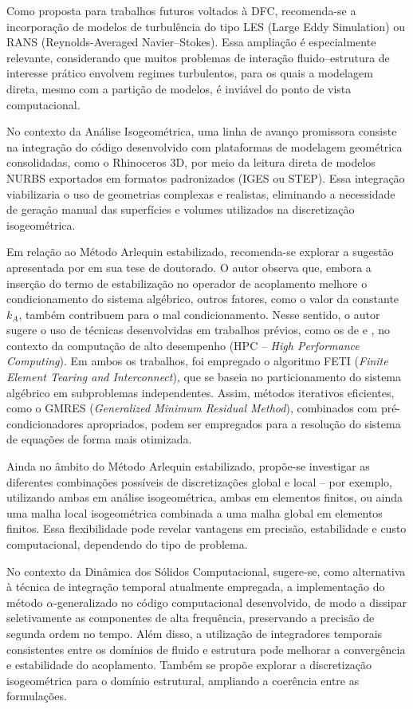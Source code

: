 Como proposta para trabalhos futuros voltados à DFC, recomenda-se a incorporação de modelos de turbulência do tipo LES (Large Eddy Simulation) ou RANS (Reynolds-Averaged Navier–Stokes). Essa ampliação é especialmente relevante, considerando que muitos problemas de interação fluido–estrutura de interesse prático envolvem regimes turbulentos, para os quais a modelagem direta, mesmo com a partição de modelos, é inviável do ponto de vista computacional.

No contexto da Análise Isogeométrica, uma linha de avanço promissora consiste na integração do código desenvolvido com plataformas de modelagem geométrica consolidadas, como o Rhinoceros 3D, por meio da leitura direta de modelos NURBS exportados em formatos padronizados (IGES ou STEP). Essa integração viabilizaria o uso de geometrias complexas e realistas, eliminando a necessidade de geração manual das superfícies e volumes utilizados na discretização isogeométrica.

Em relação ao Método Arlequin estabilizado, recomenda-se explorar a sugestão apresentada por  em sua tese de doutorado. O autor observa que, embora a inserção do termo de estabilização no operador de acoplamento melhore o condicionamento do sistema algébrico, outros fatores, como o valor da constante $k_A$, também contribuem para o mal condicionamento.  
Nesse sentido, o autor sugere o uso de técnicas desenvolvidas em trabalhos prévios, como os de  e , no contexto da computação de alto desempenho (HPC -- \textit{High Performance Computing}).  
Em ambos os trabalhos, foi empregado o algoritmo FETI (\textit{Finite Element Tearing and Interconnect}), que se baseia no particionamento do sistema algébrico em subproblemas independentes.  
Assim, métodos iterativos eficientes, como o GMRES (\textit{Generalized Minimum Residual Method}), combinados com pré-condicionadores apropriados, podem ser empregados para a resolução do sistema de equações de forma mais otimizada.

Ainda no âmbito do Método Arlequin estabilizado, propõe-se investigar as diferentes combinações possíveis de discretizações global e local -- por exemplo, utilizando ambas em análise isogeométrica, ambas em elementos finitos, ou ainda uma malha local isogeométrica combinada a uma malha global em elementos finitos. Essa flexibilidade pode revelar vantagens em precisão, estabilidade e custo computacional, dependendo do tipo de problema.

No contexto da Dinâmica dos Sólidos Computacional, sugere-se, como alternativa à técnica de integração temporal atualmente empregada, a implementação do método $\alpha$-generalizado no código computacional desenvolvido, de modo a dissipar seletivamente as componentes de alta frequência, preservando a precisão de segunda ordem no tempo.  
Além disso, a utilização de integradores temporais consistentes entre os domínios de fluido e estrutura pode melhorar a convergência e estabilidade do acoplamento. Também se propõe explorar a discretização isogeométrica para o domínio estrutural, ampliando a coerência entre as formulações.

